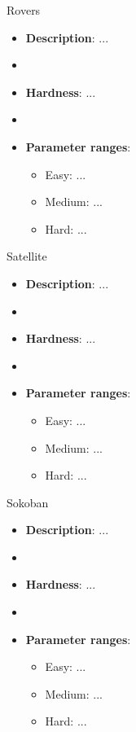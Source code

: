 \documentclass[aspectratio=169,xcolor=dvipsnames]{beamer}
\begin{document}
\begin{frame}{Rovers}

    \begin{itemize}
        \item \textbf{Description}: ...
        \item[]
        \item \textbf{Hardness}: ... 
        \item[]
        \item \textbf{Parameter ranges}: 
        \begin{itemize}
            \item Easy: ...
            \item Medium: ...
            \item Hard: ...
        \end{itemize}
    \end{itemize}
    
\end{frame}


\begin{frame}{Satellite}

    \begin{itemize}
        \item \textbf{Description}: ...
        \item[]
        \item \textbf{Hardness}: ... 
        \item[]
        \item \textbf{Parameter ranges}: 
        \begin{itemize}
            \item Easy: ...
            \item Medium: ...
            \item Hard: ...
        \end{itemize}
    \end{itemize}
    
\end{frame}


\begin{frame}{Sokoban}

    \begin{itemize}
        \item \textbf{Description}: ...
        \item[]
        \item \textbf{Hardness}: ... 
        \item[]
        \item \textbf{Parameter ranges}: 
        \begin{itemize}
            \item Easy: ...
            \item Medium: ...
            \item Hard: ...
        \end{itemize}
    \end{itemize}
    
\end{frame}
\end{document}
